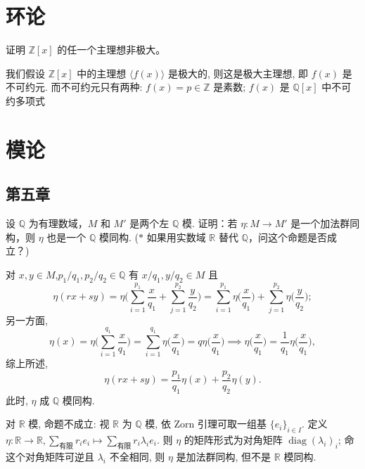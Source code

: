 \section{环论}
\setcounter{pb}{8}
\begin{problem}
    证明 $ \mathbb{Z}[x] $ 的任一个主理想非极大。
\end{problem}

\begin{solution}
    我们假设 $\mathbb{Z}[x]$ 中的主理想 $\langle f(x) \rangle $ 是极大的, 则这是极大主理想, 即 $f(x)$ 是不可约元. 
    而不可约元只有两种: $f(x)=p\in\mathbb{Z}$ 是素数; $f(x)$ 是 $\mathbb{Q}[x]$ 中不可约多项式
\end{solution}

\section{模论}
\subsection{第五章}
\setcounter{pb}{4}
\begin{problem}
    设 $ \mathbb{Q} $ 为有理数域，$ M $ 和 $ M' $ 是两个左 $ \mathbb{Q} $ 模. 证明：若 $ \eta : M \to M' $ 是一个加法群同构，则 $ \eta $ 也是一个 $ \mathbb{Q} $ 模同构. 
    ($*$ 如果用实数域 $ \mathbb{R} $ 替代 $ \mathbb{Q} $，问这个命题是否成立？)
\end{problem}

\begin{solution}
    对 $ x,y\in M$,$ p_{1}/q_{1},p_{2}/q_{2}\in\mathbb{Q}$ 有 $x/q_{1}, y/q_{2}\in M$ 且
        \[
            \eta(r x+s y)=\eta\Big(\sum_{i=1}^{p_{1}}\frac{x}{q_{1}}+\sum_{j=1}^{p_{2}}\frac{y}{q_{2}}\Big)
            =\sum_{i=1}^{p_{1}}\eta\Big(\frac{x}{q_{1}}\Big)+\sum_{j=1}^{p_{2}}\eta\Big(\frac{y}{q_{2}}\Big);
        \]
    另一方面, 
        \[
            \eta(x)=\eta\Big(\sum_{i=1}^{q_{1}}\frac{x}{q_{1}}\Big)=\sum_{i=1}^{q_{1}}\eta\Big(\frac{x}{q_{1}}\Big)=q\eta\Big(\frac{x}{q_{1}}\Big)\implies \eta\Big(\frac{x}{q_{1}}\Big)=\frac{1}{q_{1}}\eta\Big(\frac{x}{q_{1}}\Big),
        \]
    综上所述, 
        \[
            \eta(r x+s y)=\frac{p_{1}}{q_{1}}\eta(x)+\frac{p_{2}}{q_{2}}\eta(y).
        \]
    此时, $\eta$ 成 $\mathbb{Q}$ 模同构.
    \par 对 $\mathbb{R}$ 模, 命题不成立: 视 $\mathbb{R}$ 为 $\mathbb{Q}$ 模, 依 Zorn 引理可取一组基 $\{e_{i}\}_{i\in I}$. 
    定义 $\eta\colon \mathbb{R}\to\mathbb{R}, \sum_{\text{有限}}r_{i}e_{i}\mapsto\sum_{\text{有限}}r_{i}\lambda_{i}e_{i}$. 
    则 $\eta$ 的矩阵形式为对角矩阵 $\operatorname{diag}(\lambda_{i})_{i}$; 命这个对角矩阵可逆且 $\lambda_{i}$ 不全相同, 则 $\eta$ 是加法群同构, 但不是 $\mathbb{R}$ 模同构.
\end{solution}

